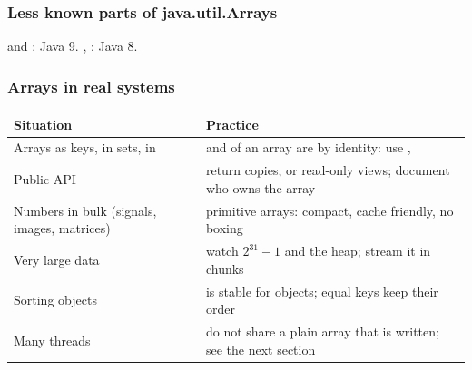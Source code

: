 \documentclass[aspectratio=169,10pt,compress]{beamer}
\begin{document}




\begin{frame}[t,fragile] \frametitle{Less known parts of java.util.Arrays}

	\footnotesize {} and : Java 9. , : Java 8.
\end{frame}




\begin{frame}[t,fragile] \frametitle{Arrays in real systems}


\begin{table}
		\footnotesize
		\begin{tabular}{@{}L{0.30\textwidth}L{0.62\textwidth}@{}}
			\toprule
			\textbf{Situation} & \textbf{Practice} \\
			\midrule
			Arrays as keys, in sets, in   &  and  of an array are by identity: use ,  \\
			Public API                                  & return copies, or read-only views; document who owns the array \\
			Numbers in bulk (signals, images, matrices) & primitive arrays: compact, cache friendly, no boxing \\
			Very large data                             & watch $2^{31} - 1$ and the heap; stream it in chunks \\
			Sorting objects                             &  is stable for objects; equal keys keep their order \\
			Many threads                                & do not share a plain array that is written; see the next section \\
			\bottomrule
		\end{tabular}
\end{table}%


\end{frame}
\end{document}
